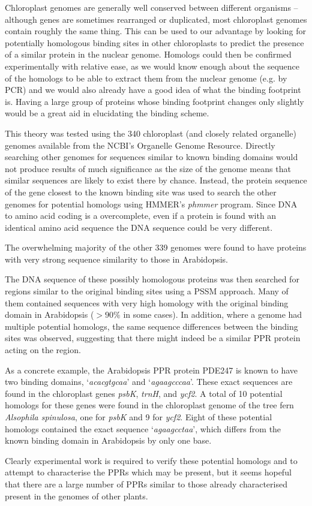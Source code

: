 Chloroplast genomes are generally well conserved between different organisms --
although genes are sometimes rearranged or duplicated, most chloroplast genomes
contain roughly the same thing.
This can be used to our advantage by looking for potentially homologous binding
sites in other chloroplasts to predict the presence of a similar protein in 
the nuclear genome.
Homologs could then be confirmed experimentally with relative ease, as we would 
know enough about the sequence of the homologs to be able to extract them from 
the nuclear genome (e.g. by PCR) and we would also already have a good idea of 
what the binding footprint is.
Having a large group of proteins whose binding footprint changes only slightly
would be a great aid in elucidating the binding scheme.

This theory was tested using the 340 chloroplast (and closely related
organelle)
genomes available from the NCBI's Organelle Genome Resource.
Directly searching other genomes for sequences similar to known binding domains
would not produce results of much significance as the size of the genome means
that similar sequences are likely to exist there by chance.
Instead, the protein sequence of the gene closest to the known binding site was 
used to search the other genomes for potential homologs using HMMER's
\emph{phmmer} program.
Since DNA to amino acid coding is a overcomplete, even if a protein is found
with an identical amino acid sequence the DNA sequence could be very different.

The overwhelming majority of the other 339 genomes were found to have proteins 
with very strong sequence similarity to those in Arabidopsis. 

The DNA sequence of these possibly homologous proteins was then searched for 
regions similar to the original binding sites using a PSSM approach.
Many of them contained sequences with very high homology
with the original binding domain in Arabidopsis ($>90\%$ in some cases).
In addition, where a genome had multiple potential homologs, the same sequence
differences between the binding sites was observed, suggesting that there might
indeed be a similar PPR protein acting on the region.

As a concrete example, the Arabidopsis PPR protein PDE247 is known to have two 
binding domains, `\emph{acacgtgcaa}' and `\emph{agaagcccaa}'.
These exact sequences are found in the chloroplast genes \emph{psbK}, 
\emph{trnH}, and \emph{ycf2}.
A total of 10 potential homologs for these genes were found in the chloroplast
genome of the tree fern \emph{Alsophila spinulosa}, one for \emph{psbK} and 9
for \emph{ycf2}.
Eight of these potential homologs contained the exact sequence 
`\emph{agaagcctaa}', which differs from the known binding domain in Arabidopsis
by only one base.

Clearly experimental work is required to verify these potential homologs and to
attempt to characterise the PPRs which may be present, but it seems hopeful
that there are a large number of PPRs similar to those already characterised
present in the genomes of other plants.

